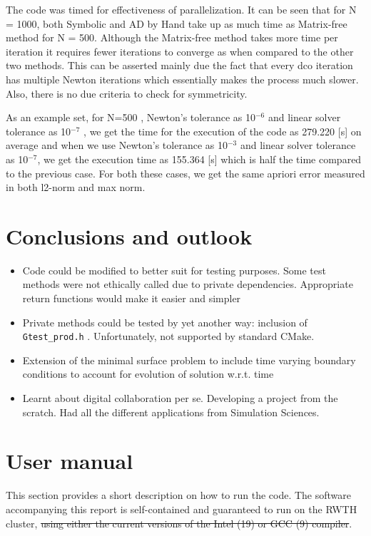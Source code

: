 \documentclass[11pt]{scrartcl}
\begin{document}
The code was timed for effectiveness of parallelization. It can be seen that for N = 1000, both Symbolic and AD by Hand take up as much time as Matrix-free method for N = 500. Although the Matrix-free method takes more time per iteration it requires fewer iterations to converge as when compared to the other two methods.
This can be asserted mainly due the fact that every dco iteration has multiple Newton iterations which essentially makes the process much slower. Also, there is no due criteria to check for symmetricity.


As an example set, for N=500 , Newton's tolerance as 10$^{-6}$ and linear solver tolerance as 10$^{-7}$ , we get the time for the execution of the code as 279.220 [s] on average and when we use Newton's tolerance as 10$^{-3}$ and linear solver tolerance as 10$^{-7}$, we get the execution time as 155.364 [s] which is half the time compared to the previous case. For both these cases, we get the same apriori error measured in both l2-norm and max norm.


\section{Conclusions and outlook}
\begin{itemize}
	\item {Code could be modified to better suit for testing purposes. Some test methods were not ethically called due to private dependencies. Appropriate return functions would make it easier and simpler}
	\item {Private methods could be tested by yet another way: inclusion of \texttt{Gtest\_prod.h} . Unfortunately, not supported by standard CMake.}
	\item {Extension of the minimal surface problem to include time varying boundary conditions to account for evolution of solution w.r.t. time}
	\item {Learnt about digital collaboration per se. Developing a project from the scratch. Had all the different applications from Simulation Sciences.}
\end{itemize}


%


\clearpage
\appendix
\section{User manual}
This section provides a short description on how to run the code. The software accompanying this report is self-contained and guaranteed to run on the RWTH cluster, \sout{using either the current versions of the Intel (19) or GCC (9) compiler}.
\end{document}
